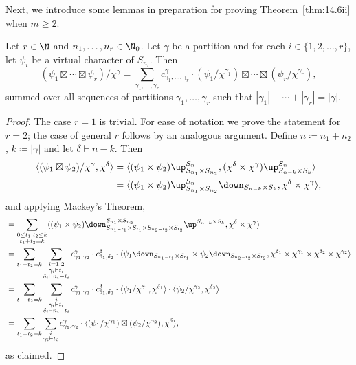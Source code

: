 Next, we introduce some lemmas in preparation for proving Theorem~\ref{thm:14.6ii} when $m\ge 2$.

\begin{lemma}\label{lem:16.2}
	Let $r\in\N$ and $n_1,\dotsc,n_r\in\N_0$. Let $\gamma$ be a partition and for each $i\in\{1,2,\dotsc,r\}$, let $\psi_i$ be a virtual character of $S_{n_i}$. Then
	\[ (\psi_1\boxtimes\cdots\boxtimes\psi_r)/\chi^\gamma = \sum_{\gamma_1,\dotsc,\gamma_r} c^\gamma_{\gamma_1,\dotsc,\gamma_r}\cdot (\psi_1/\chi^{\gamma_1})\boxtimes\cdots\boxtimes(\psi_r/\chi^{\gamma_r}), \]
	summed over all sequences of partitions $\gamma_1,\dotsc,\gamma_r$ such that $|\gamma_1|+\cdots+|\gamma_r|=|\gamma|$.
\end{lemma}

\begin{proof}
	The case $r=1$ is trivial. For ease of notation we prove the statement for $r=2$; the case of general $r$ follows by an analogous argument. Define $n\coloneqq n_1+n_2$, $k\coloneqq |\gamma|$ and let $\delta\vdash n-k$. Then
	\begin{align*}
		\langle (\psi_1\boxtimes\psi_2)/\chi^\gamma,\chi^\delta\rangle &= \langle (\psi_1\times\psi_2)\up_{S_{n_1}\times S_{n_2}}^{S_n}, (\chi^\delta\times\chi^\gamma)\up_{S_{n-k}\times S_k}^{S_n}\rangle\\
		&= \langle (\psi_1\times\psi_2)\up_{S_{n_1}\times S_{n_2}}^{S_n}\down_{S_{n-k}\times S_k}, \chi^\delta\times\chi^\gamma\rangle,
	\end{align*}
	and applying Mackey's Theorem,
	\footnotesize
	\begin{align*}
		&= \sum_{\substack{0\le t_1,t_2\le k\\ t_1+t_2=k}} \langle (\psi_1\times\psi_2)\down^{S_{n_1}\times S_{n_2}}_{S_{n_1-t_1}\times S_{t_1}\times S_{n_2-t_2}\times S_{t_2}}\up^{S_{n-k}\times S_{k}}, \chi^\delta\times\chi^\gamma\rangle\\
		&= \sum_{t_1+t_2=k} \sum_{\substack{i=1,2\\\gamma_i\vdash t_i\\\delta_i\vdash n_i-t_i}} c^\gamma_{\gamma_1,\gamma_2}\cdot c^\delta_{\delta_1,\delta_2}\cdot \langle \psi_1\down_{S_{n_1-t_1}\times S_{t_1}} \times \psi_2\down_{S_{n_2-t_2}\times S_{t_2}}, \chi^{\delta_1}\times\chi^{\gamma_1}\times\chi^{\delta_2}\times\chi^{\gamma_2}\rangle\\
		&= \sum_{t_1+t_2=k} \sum_{\substack{i\\\gamma_i\vdash t_i\\\delta_i\vdash n_i-t_i}} c^\gamma_{\gamma_1,\gamma_2}\cdot c^\delta_{\delta_1,\delta_2}\cdot \langle \psi_1/\chi^{\gamma_1},\chi^{\delta_1}\rangle\cdot\langle \psi_2/\chi^{\gamma_2},\chi^{\delta_2}\rangle\\
		&= \sum_{t_1+t_2=k} \sum_{\substack{i\\\gamma_i\vdash t_i}} c^\gamma_{\gamma_1,\gamma_2}\cdot \langle (\psi_1/\chi^{\gamma_1})\boxtimes(\psi_2/\chi^{\gamma_2}), \chi^\delta\rangle,
	\end{align*}
	\normalsize
	as claimed.
\end{proof}

